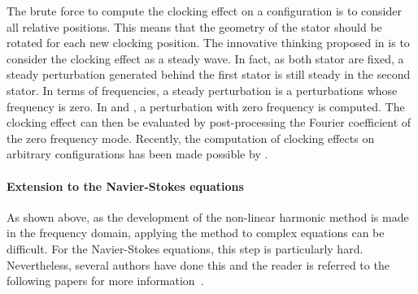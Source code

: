 The brute force to compute the clocking effect on a
configuration is to consider all relative positions. This means
that the geometry of the stator should be rotated for each new 
clocking position. The innovative thinking proposed in 
\citet{He2002} is to consider the clocking effect as a steady wave.
In fact, as both stator are fixed, a steady perturbation
generated behind the first stator is still steady in the second stator.
In terms of frequencies, a steady perturbation is a perturbations 
whose frequency is zero. In \citet{He2002} and \citet{Vilmin2009}, 
a perturbation with zero frequency
is computed. The clocking effect can then be evaluated by
post-processing the Fourier coefficient of the zero frequency mode.
Recently, the computation of clocking effects on
arbitrary configurations has been made possible
by \citet{Vilmin2013a}.

\paragraph{Extension to the Navier-Stokes equations}
As shown above,  as the development of the non-linear harmonic
method is made in the frequency domain, applying the method to
complex equations can be difficult. For the Navier-Stokes equations,
this step is particularly hard. Nevertheless, several authors have
done this and the reader is referred to the following papers
for more information~\cite{He1998,Chen2001, He2002, Vilmin2006}.


